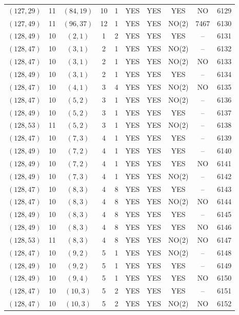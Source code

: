 \begin{longtable}{|c|c|c|c|c|c|c|c|c|c|}
$(127, 29)$ & 11 & $(84, 19)$ & 10 & 1 & YES & YES & YES & NO & 6129\\
$(127, 49)$ & 11 & $(96, 37)$ & 12 & 1 & YES & YES & NO(2) & 7467 & 6130\\
$(128, 49)$ & 10 & $(2, 1)$ & 1 & 2 & YES & YES & YES & -- & 6131\\
$(128, 47)$ & 10 & $(3, 1)$ & 2 & 1 & YES & YES & NO(2) & -- & 6132\\
$(128, 47)$ & 10 & $(3, 1)$ & 2 & 1 & YES & YES & NO(2) & NO & 6133\\
$(128, 49)$ & 10 & $(3, 1)$ & 2 & 1 & YES & YES & YES & -- & 6134\\
$(128, 47)$ & 10 & $(4, 1)$ & 3 & 4 & YES & YES & NO(2) & NO & 6135\\
$(128, 47)$ & 10 & $(5, 2)$ & 3 & 1 & YES & YES & NO(2) & -- & 6136\\
$(128, 49)$ & 10 & $(5, 2)$ & 3 & 1 & YES & YES & YES & -- & 6137\\
$(128, 53)$ & 11 & $(5, 2)$ & 3 & 1 & YES & YES & NO(2) & -- & 6138\\
$(128, 47)$ & 10 & $(7, 3)$ & 4 & 1 & YES & YES & YES & -- & 6139\\
$(128, 49)$ & 10 & $(7, 2)$ & 4 & 1 & YES & YES & YES & -- & 6140\\
$(128, 49)$ & 10 & $(7, 2)$ & 4 & 1 & YES & YES & YES & NO & 6141\\
$(128, 49)$ & 10 & $(7, 3)$ & 4 & 1 & YES & YES & NO(2) & -- & 6142\\
$(128, 47)$ & 10 & $(8, 3)$ & 4 & 8 & YES & YES & YES & -- & 6143\\
$(128, 47)$ & 10 & $(8, 3)$ & 4 & 8 & YES & YES & NO(2) & NO & 6144\\
$(128, 49)$ & 10 & $(8, 3)$ & 4 & 8 & YES & YES & YES & -- & 6145\\
$(128, 49)$ & 10 & $(8, 3)$ & 4 & 8 & YES & YES & YES & NO & 6146\\
$(128, 53)$ & 11 & $(8, 3)$ & 4 & 8 & YES & YES & NO(2) & NO & 6147\\
$(128, 47)$ & 10 & $(9, 2)$ & 5 & 1 & YES & YES & NO(2) & -- & 6148\\
$(128, 49)$ & 10 & $(9, 2)$ & 5 & 1 & YES & YES & YES & -- & 6149\\
$(128, 49)$ & 10 & $(9, 4)$ & 5 & 1 & YES & YES & YES & NO & 6150\\
$(128, 47)$ & 10 & $(10, 3)$ & 5 & 2 & YES & YES & YES & -- & 6151\\
$(128, 47)$ & 10 & $(10, 3)$ & 5 & 2 & YES & YES & NO(2) & NO & 6152\\

\end{longtable}
